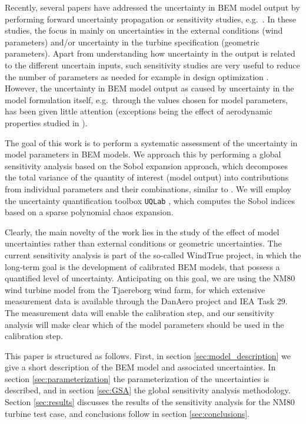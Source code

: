 \documentclass[review]{elsarticle}
\numberwithin{equation}{section}
\numberwithin{equation}{section}
\begin{document}
Recently, several papers have addressed the uncertainty in BEM model output by performing forward uncertainty propagation or sensitivity studies, e.g.\ \cite{Bos2019a,Echeverria2017,Matthaus2017,Murcia2018,Robertson2018}. In these studies, the focus in mainly on uncertainties in the external conditions (wind parameters) and/or uncertainty in the turbine specification (geometric parameters). Apart from understanding how uncertainty in the output is related to the different uncertain inputs, such sensitivity studies are very useful to reduce the number of parameters as needed for example in design optimization \cite{Echeverria2017}. However, the uncertainty in BEM model output as caused by uncertainty in the model formulation itself, e.g.\ through the values chosen for model parameters, has been given little attention (exceptions being the effect of aerodynamic properties studied in \cite{Matthaus2017,Bortolotti2019}).

The goal of this work is to perform a systematic assessment of the uncertainty in model parameters in BEM models. We approach this by performing a global sensitivity analysis based on the Sobol expansion approach, which decomposes the total variance of the quantity of interest (model output) into contributions from individual parameters and their combinations, similar to \cite{Echeverria2017,Murcia2018,Rinker2016}. We will employ the uncertainty quantification toolbox \texttt{UQLab} \cite{uqlab}, which computes the Sobol indices based on a sparse polynomial chaos expansion. 

Clearly, the main novelty of the work lies in the study of the effect of model uncertainties rather than external conditions or geometric uncertainties. The current sensitivity analysis is part of the so-called WindTrue project, in which the long-term goal is the development of calibrated BEM models, that possess a quantified level of uncertainty. Anticipating on this goal, we are using the NM80 wind turbine model from the Tjaereborg wind farm, for which extensive measurement data is available through the DanAero project \cite{Troldborg2013} and IEA Task 29. The measurement data will enable the calibration step, and our sensitivity analysis will make clear which of the model parameters should be used in the calibration step.

This paper is structured as follows. First, in section \ref{sec:model_description} we give a short description of the BEM model and associated uncertainties. In section \ref{sec:parameterization} the parameterization of the uncertainties is described, and in section \ref{sec:GSA} the global sensitivity analysis methodology. Section \ref{sec:results} discusses the results of the sensitivity analysis for the NM80 turbine test case, and conclusions follow in section \ref{sec:conclusions}.
\end{document}
